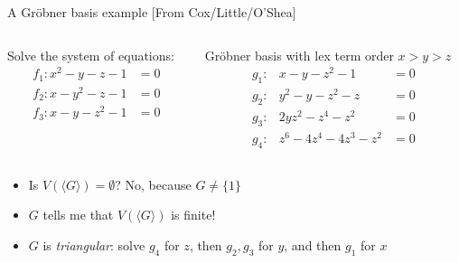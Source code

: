 \documentclass[xcolor=dvipsnames]{beamer}
\newcommand{\bi}{\begin{itemize}}
\newcommand{\ei}{\end{itemize}}
\begin{document}
\begin{frame}{{\large A Gr\"obner basis example [From Cox/Little/O'Shea]}}


\begin{columns}

\begin{column}{5cm}
Solve the system of equations:
\begin{align*}
f_1: x^2 - y - z -1 &= 0\\
f_2: x - y^2 - z -1 &= 0\\
f_3: x -y -z^2 -1   & =0
\end{align*}
\end{column}

\begin{column}{4.5cm}

Gr\"obner basis with lex term order $x > y > z$
\begin{align*}
g_1: & x - y - z^2 -1 & =0\\
g_2: & y^2 - y - z^2 - z & =0\\
g_3: & 2yz^2 - z^4 - z^2 & = 0\\
g_4: & z^6 - 4z^4 - 4z^3 - z^2 & = 0
\end{align*}
\end{column}

\end{columns}

\bi
\item Is $V(\langle G \rangle) = \emptyset$? No, because $G \neq \{1\}$
\item $G$ tells me that $V(\langle G \rangle)$ is finite!
\item $G$ is {\it triangular}: solve $g_4$ for $z$, then $g_2, g_3$
  for $y$, and then $g_1$ for $x$
\ei

\end{frame}
\end{document}
